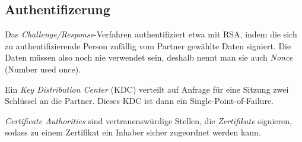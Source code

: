 \documentclass[a4paper,parskip=half*,DIV=15,fontsize=11pt]{scrartcl}
\begin{document}
\subsection{Authentifizerung}

Das \emph{Challenge/Response}-Verfahren authentifiziert etwa mit RSA, indem die sich zu authentifizierende Person zufällig vom Partner gewählte Daten signiert. Die Daten müssen also noch nie verwendet sein, deshalb nennt man sie auch \emph{Nonce} (Number used once).

Ein \emph{Key Distribution Center} (KDC) verteilt auf Anfrage für eine Sitzung zwei Schlüssel an die Partner. Dieses KDC ist dann ein Single-Point-of-Failure.

\emph{Certificate Authorities} sind vertrauenswürdige Stellen, die \emph{Zertifikate} signieren, sodass zu einem Zertifikat ein Inhaber sicher zugeordnet werden kann.
\end{document}
